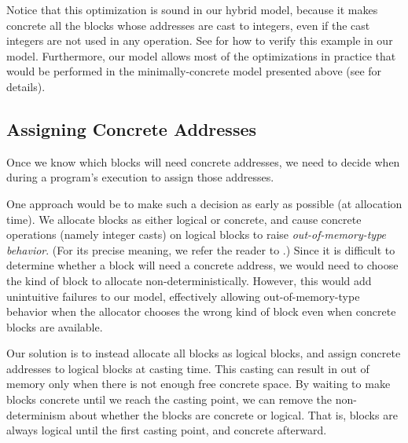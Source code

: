 Notice that this optimization is sound in our hybrid model, because it makes concrete all the blocks
whose addresses are cast to integers, even if the cast integers are not used in any operation.  See
 for how to verify this example in our model.
Furthermore, our model allows most of the optimizations in practice that would be performed in the
minimally-concrete model presented above (see  for
details).


\subsection{Assigning Concrete Addresses}
\label{sec:intptrcast:formal-semantics:ownership}

Once we know which blocks will need concrete addresses, we need to
decide when during a program's execution to assign those addresses.

One approach would be to make such a decision as early as possible (\ie at allocation time). We
allocate blocks as either logical or concrete, and cause concrete operations (namely integer casts)
on logical blocks to raise \emph{out-of-memory-type behavior}.  (For its precise meaning, we refer
the reader to .)  Since it is difficult to determine
whether a block will need a concrete address,
we would need to choose the kind of block to allocate
non-deterministically. However, this would add unintuitive failures to
our model, effectively allowing out-of-memory-type behavior when the
allocator chooses the wrong kind of block even when concrete blocks
are available.

Our solution is to instead allocate all blocks as logical blocks, and assign concrete addresses to logical blocks at casting time. This casting can result in out of memory only when there is not enough free concrete space. By waiting to make blocks concrete until we reach the casting point,
we can remove the non-determinism about whether the blocks are
concrete or logical. That is, blocks are always logical until the
first casting point, and concrete afterward.

